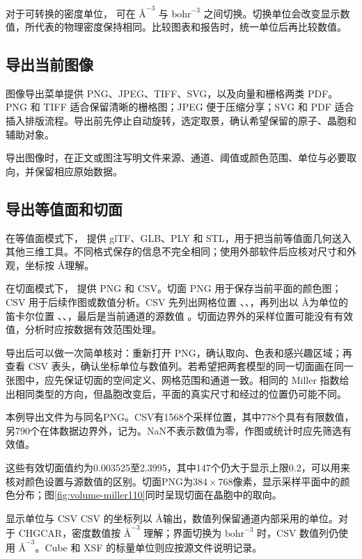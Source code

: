 对于可转换的密度单位， 可在 $\text{\AA}^{-3}$ 与 $\mathrm{bohr}^{-3}$ 之间切换。切换单位会改变显示数值，所代表的物理密度保持相同。比较图表和报告时，统一单位后再比较数值。

\subsection{导出当前图像}

图像导出菜单提供 PNG、JPEG、TIFF、SVG，以及向量和栅格两类 PDF。PNG 和 TIFF 适合保留清晰的栅格图；JPEG 便于压缩分享；SVG 和 PDF 适合插入排版流程。导出前先停止自动旋转，选定取景，确认希望保留的原子、晶胞和辅助对象。

导出图像时，在正文或图注写明文件来源、通道、阈值或颜色范围、单位与必要取向，并保留相应原始数据。

\subsection{导出等值面和切面}

在等值面模式下， 提供 glTF、GLB、PLY 和 STL，用于把当前等值面几何送入其他三维工具。不同格式保存的信息不完全相同；使用外部软件后应核对尺寸和外观，坐标按 \AA 理解。

在切面模式下， 提供 PNG 和 CSV。切面 PNG 用于保存当前平面的颜色图；CSV 用于后续作图或数值分析。CSV 先列出网格位置 、、，再列出以 \AA 为单位的笛卡尔位置 \mbox{}、\mbox{}、\mbox{}，最后是当前通道的源数值 。切面边界外的采样位置可能没有有效值，分析时应按数据有效范围处理。

导出后可以做一次简单核对：重新打开 PNG，确认取向、色表和感兴趣区域；再查看 CSV 表头，确认坐标单位与数值列。若希望把两套模型的同一切面画在同一张图中，应先保证切面的空间定义、网格范围和通道一致。相同的 Miller 指数给出相同类型的方向，但晶胞改变后，平面的真实尺寸和经过的位置仍可能不同。

本例导出文件为与同名PNG。CSV有1568个采样位置，其中778个具有有限数值，另790个在体数据边界外，记为。NaN不表示数值为零，作图或统计时应先筛选有效值。

这些有效切面值约为0.003525至2.3995，其中147个仍大于显示上限0.2，可以用来核对颜色设置与源数值的区别。切面PNG为$384\times768$像素，显示采样平面中的颜色分布；图\ref{fig:volume-miller110}同时呈现切面在晶胞中的取向。

\begin{notebox}{显示单位与 CSV}
CSV 的坐标列以 \AA 输出，数值列保留通道内部采用的单位。对于 \mbox{CHGCAR}，密度数值按 $\text{\AA}^{-3}$ 理解；界面切换为 $\mathrm{bohr}^{-3}$ 时，CSV 数值列仍使用 $\text{\AA}^{-3}$。Cube 和 XSF 的标量单位则应按源文件说明记录。
\end{notebox}

